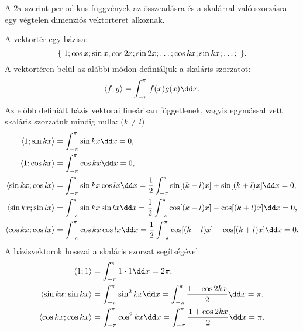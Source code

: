 \documentclass[a4paper, 12pt]{scrartcl}
\begin{document}
\begin{blueBox}

  A $2\pi$ szerint periodikus függvények az összeadásra és a skalárral való
  szorzásra egy végtelen dimenziós vektorteret alkoznak.

  A vektortér egy bázisa:
  $$
    \{\;
    1;
    \cos x; \sin x;
    \cos 2x; \sin 2x;
    \dots;
    \cos kx; \sin kx;
    \dots;
    \;\}
    \text.
  $$
  A vektortéren belül az alábbi módon definiáljuk a skaláris szorzatot:
  $$
    \langle f; g \rangle
    = \int_{-\pi}^{\pi} f(x) g(x) \dd x
    \text.
  $$
  Az előbb definiált bázis vektorai lineárisan függetlenek, vagyis egymással
  vett skaláris szorzatuk mindig nulla: ($k \neq l$)
  \begin{align*}
    \langle 1; \sin kx \rangle
     & = \int_{-\pi}^{\pi} \sin kx \dd x = 0
    \text,
    \\
    \langle 1; \cos kx \rangle
     & = \int_{-\pi}^{\pi} \cos kx \dd x = 0
    \text,
    \\
    \langle \sin kx; \cos lx \rangle
     & = \int_{-\pi}^{\pi} \sin kx \cos lx \dd x
    = \frac{1}{2} \int_{-\pi}^{\pi} \sin[(k-l)x] + \sin[(k+l)x] \dd x
    = 0
    \text,
    \\
    \langle \sin kx; \sin lx \rangle
     & = \int_{-\pi}^{\pi} \sin kx \sin lx \dd x
    = \frac{1}{2} \int_{-\pi}^{\pi} \cos[(k-l)x] - \cos[(k+l)x] \dd x
    = 0
    \text,
    \\
    \langle \cos kx; \cos lx \rangle
     & = \int_{-\pi}^{\pi} \cos kx \cos lx \dd x
    = \frac{1}{2} \int_{-\pi}^{\pi} \cos[(k-l)x] + \cos[(k+l)x] \dd x
    = 0
    \text.
  \end{align*}
  A bázisvektorok hosszai a skaláris szorzat segítségével:
  \begin{align*}
    \langle 1; 1 \rangle
     & = \int_{-\pi}^{\pi} 1 \cdot 1 \dd x = 2\pi
    \text,
    \\
    \langle \sin kx; \sin kx \rangle
     & = \int_{-\pi}^{\pi} \sin^2 kx \dd x =
    \int_{-\pi}^{\pi} \frac{1 - \cos 2kx}{2} \dd x
    = \pi
    \text,
    \\
    \langle \cos kx; \cos kx \rangle
     & = \int_{-\pi}^{\pi} \cos^2 kx \dd x =
    \int_{-\pi}^{\pi} \frac{1 + \cos 2kx}{2} \dd x
    = \pi
    \text.
  \end{align*}

\end{blueBox}
\end{document}
